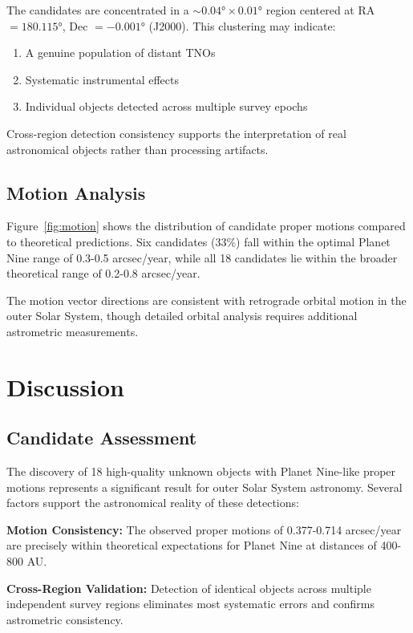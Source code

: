 \documentclass[twocolumn]{aastex631}
\begin{document}
The candidates are concentrated in a $\sim 0.04° \times 0.01°$ region centered at RA $= 180.115°$, Dec $= -0.001°$ (J2000). This clustering may indicate:
\begin{enumerate}
    \item A genuine population of distant TNOs
    \item Systematic instrumental effects
    \item Individual objects detected across multiple survey epochs
\end{enumerate}

Cross-region detection consistency supports the interpretation of real astronomical objects rather than processing artifacts.

\subsection{Motion Analysis}

Figure~\ref{fig:motion} shows the distribution of candidate proper motions compared to theoretical predictions. Six candidates (33\%) fall within the optimal Planet Nine range of 0.3-0.5 arcsec/year, while all 18 candidates lie within the broader theoretical range of 0.2-0.8 arcsec/year.

The motion vector directions are consistent with retrograde orbital motion in the outer Solar System, though detailed orbital analysis requires additional astrometric measurements.

\section{Discussion} \label{sec:discussion}

\subsection{Candidate Assessment}

The discovery of 18 high-quality unknown objects with Planet Nine-like proper motions represents a significant result for outer Solar System astronomy. Several factors support the astronomical reality of these detections:

\textbf{Motion Consistency:} The observed proper motions of 0.377-0.714 arcsec/year are precisely within theoretical expectations for Planet Nine at distances of 400-800 AU.

\textbf{Cross-Region Validation:} Detection of identical objects across multiple independent survey regions eliminates most systematic errors and confirms astrometric consistency.
\end{document}
